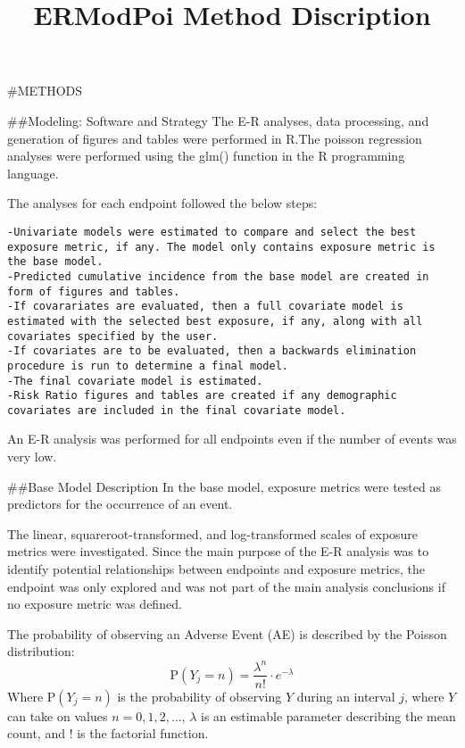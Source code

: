 \documentclass[
]{article}
\title{ERModPoi Method Discription}
\author{}
\date{\vspace{-2.5em}}
\begin{document}
\maketitle

\#METHODS

\#\#Modeling: Software and Strategy The E-R analyses, data processing,
and generation of figures and tables were performed in R.The poisson
regression analyses were performed using the glm() function in the R
programming language.

The analyses for each endpoint followed the below steps:

\begin{verbatim}
-Univariate models were estimated to compare and select the best exposure metric, if any. The model only contains exposure metric is the base model.
-Predicted cumulative incidence from the base model are created in form of figures and tables. 
-If covarariates are evaluated, then a full covariate model is estimated with the selected best exposure, if any, along with all covariates specified by the user.
-If covariates are to be evaluated, then a backwards elimination procedure is run to determine a final model.  
-The final covariate model is estimated. 
-Risk Ratio figures and tables are created if any demographic covariates are included in the final covariate model.
\end{verbatim}

An E-R analysis was performed for all endpoints even if the number of
events was very low.

\#\#Base Model Description In the base model, exposure metrics were
tested as predictors for the occurrence of an event.

The linear, squareroot-transformed, and log-transformed scales of
exposure metrics were investigated. Since the main purpose of the E-R
analysis was to identify potential relationships between endpoints and
exposure metrics, the endpoint was only explored and was not part of the
main analysis conclusions if no exposure metric was defined.

The probability of observing an Adverse Event (AE) is described by the
Poisson distribution: \begin{equation}
\label{eqn:P}
\text{P}\left(Y_{j} = n\right) = \frac{\lambda^{n}}{n!}\cdot e^{-\lambda}
\end{equation} Where \(\text{P}\left(Y_{j} = n\right)\) is the
probability of observing \(Y\) during an interval \(j\), where \(Y\) can
take on values \(n = 0, 1, 2,\dotsc\), \(\lambda\) is an estimable
parameter describing the mean count, and \(!\) is the factorial
function.
\end{document}
